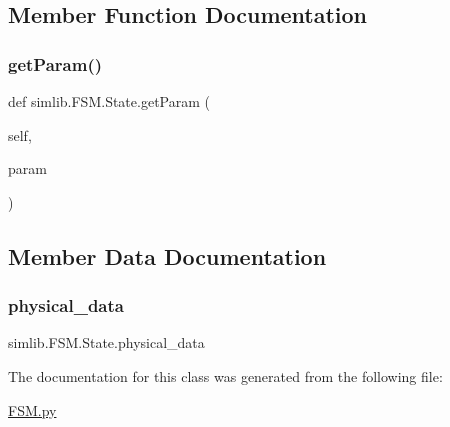 \subsection{Member Function Documentation}
\mbox{\label{classsimlib_1_1_f_s_m_1_1_state_a92eddcb3c69993196174f4626ac01cb6}} 
\subsubsection{\texorpdfstring{get\+Param()}{getParam()}}
{\footnotesize\ttfamily def simlib.\+F\+S\+M.\+State.\+get\+Param (\begin{DoxyParamCaption}\item[{}]{self,  }\item[{}]{param }\end{DoxyParamCaption})}



\subsection{Member Data Documentation}
\mbox{\label{classsimlib_1_1_f_s_m_1_1_state_ad26863e22f2f1f410b06d09d118cf340}} 
\subsubsection{\texorpdfstring{physical\+\_\+data}{physical\_data}}
{\footnotesize\ttfamily simlib.\+F\+S\+M.\+State.\+physical\+\_\+data}



The documentation for this class was generated from the following file\+:\begin{DoxyCompactItemize}
\item 
\mbox{\hyperlink{_f_s_m_8py}{F\+S\+M.\+py}}\end{DoxyCompactItemize}
